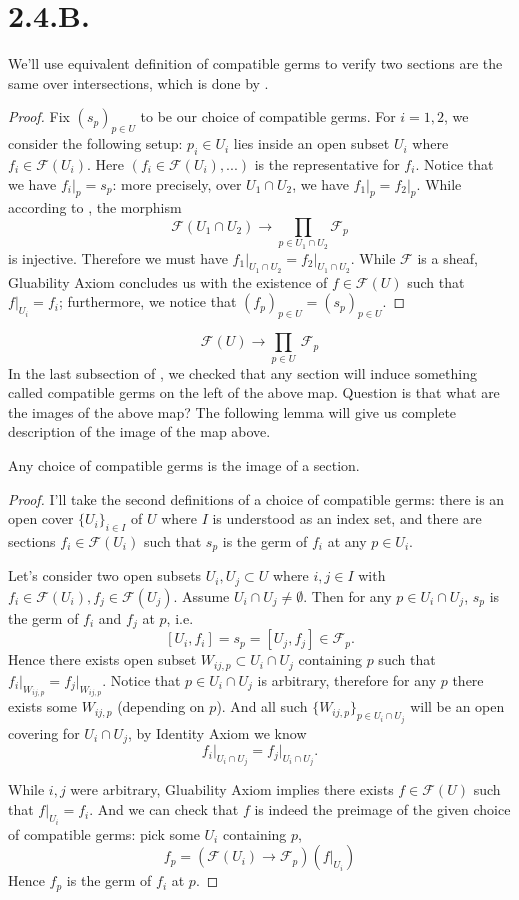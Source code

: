 \section{2.4.B.}\label{2.4.B.}
	We'll use equivalent definition of compatible germs to verify two sections are the same over intersections, which is done by .
\begin{proof}
	Fix $(s_p)_{p\in U}$ to be our choice of compatible germs.
	For $i=1,2$, we consider the following setup: $p_i\in U_i$ lies inside an open subset $U_i$ where $f_i\in\mathscr F(U_i)$. Here $(f_i\in\mathscr F(U_i),...)$ is the representative for $f_i$. Notice that we have $f_i\vert_p=s_p$: more precisely, over $U_1\cap U_2$, we have $f_1\vert_p=f_2\vert_p$. While according to , the morphism 
	\[\mathscr F(U_1\cap U_2)\to \prod_{p\in U_1\cap U_2}\mathscr F_p\] is injective. Therefore we must have $f_1\vert_{U_1\cap U_2}=f_2\vert_{U_1\cap U_2}$. While $\mathscr F$ is a sheaf, Gluability Axiom concludes us with the existence of $f\in\mathscr F(U)$ such that $f\vert_{U_i}=f_i$; furthermore, we notice that $(f_p)_{p\in U}=(s_p)_{p\in U}$. 
\end{proof}

\[\mathscr F(U)\to \prod_{p\in U}~\mathscr F_p\]
In the last subsection of , we checked that any section will induce something called compatible germs on the left of the above map. Question is that what are the images of the above map? The following lemma will give us complete description of the image of the map above.
\begin{proposition}
	Any choice of compatible germs is the image of a section.
\end{proposition}
\begin{proof}
	I'll take the second definitions of a choice of compatible germs: there is an open cover $\{U_i\}_{i\in I}$ of $U$ where $I$ is understood as an index set, and there are sections $f_i\in\mathscr F(U_i)$ such that $s_p$ is the germ of $f_i$ at any $p\in U_i$.

	
	Let's consider two open subsets $U_i,U_j\subset U$ where $i,j\in I$ with $f_i\in \mathscr F(U_i), f_j\in\mathscr F(U_j)$. Assume $U_i\cap U_j\neq\emptyset$. Then for any $p\in U_i\cap U_j$, $s_p$ is the germ of $f_i$ and $f_j$ at $p$, i.e. 
	\[[U_i,f_i]=s_p=[U_j,f_j]\in\mathscr F_p.\] Hence there exists open subset $W_{ij,p}\subset U_i\cap U_j$ containing $p$ such that $f_i\vert_{W_{ij,p}}=f_j\vert_{W_{ij,p}}$. Notice that $p\in U_i\cap U_j$ is arbitrary, therefore for any $p$ there exists some $W_{ij,p}$ (depending on $p$). And all such $\{W_{ij,p}\}_{p\in U_i\cap U_j}$ will be an open covering for $U_i\cap U_j$, by Identity Axiom we know \[f_i\vert_{U_i\cap U_j}=f_j\vert_{U_i\cap U_j}.\]

	While $i,j$ were arbitrary, Gluability Axiom implies there exists $f\in\mathscr F(U)$ such that $f\vert_{U_i}=f_i$. And we can check that $f$ is indeed the preimage of the given choice of compatible germs: pick some $U_i$ containing $p$, \[f_p=(\mathscr F(U_i)\to \mathscr F_p)(f\vert_{U_i})\] Hence $f_p$ is the germ of $f_i$ at $p$. 

\end{proof}

